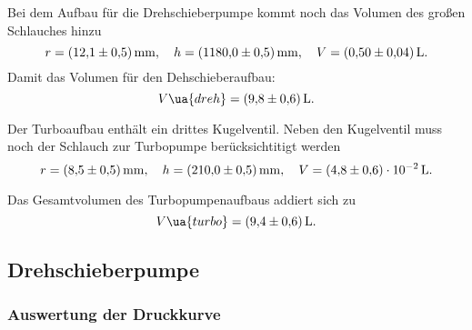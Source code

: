 Bei dem Aufbau für die Drehschieberpumpe kommt noch das Volumen des großen Schlauches hinzu
\begin{equation*}
  r=\SI{12.1\pm 0.5}{\milli\meter}, \quad h=\SI{1180\pm0.5}{\milli\meter}, \quad V=\SI{ 0.5\pm0.04}{\litre}.
\end{equation*}
Damit das Volumen für den Dehschieberaufbau:
\begin{equation}
  \label{eq:volumen_drehschieber}
  V\ua{dreh}=\SI{9.8\pm0.6}{\litre}.
\end{equation}

Der Turboaufbau enthält ein drittes Kugelventil.
Neben den Kugelventil muss noch der Schlauch zur Turbopumpe berücksichtitigt werden
\begin{equation*}
  r=\SI{8.5\pm 0.5}{\milli\meter}, \quad h=\SI{210\pm0.5}{\milli\meter}, \quad V=\SI{ 4.8\pm0.6 e-2}{\litre}.
\end{equation*}

Das Gesamtvolumen des Turbopumpenaufbaus addiert sich zu
\begin{equation}
  \label{eq:volume_turbo}
  V\ua{turbo}=\SI{9.4\pm0.6}{\litre}.
\end{equation}
\subsection{Drehschieberpumpe}

\subsubsection{Auswertung der Druckkurve}

